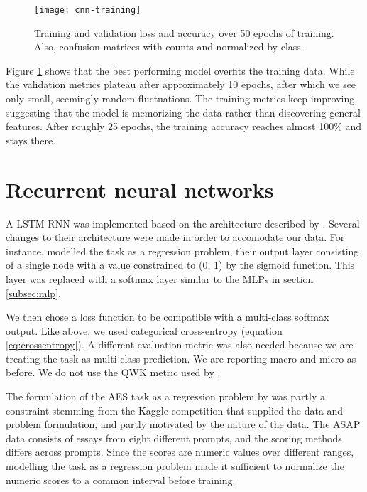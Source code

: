 \begin{figure}
  \centering
  \texttt{[image: cnn-training]}
  \caption{Training and validation loss and accuracy over 50 epochs of training.
           Also, confusion matrices with counts and normalized by class.}
  \label{fig:cnn-training}
\end{figure}

Figure \ref{fig:cnn-training} shows that the best performing model overfits
the training data. While the validation metrics plateau after approximately
10 epochs, after which we see only small, seemingly random fluctuations.
The training metrics keep improving, suggesting that the model is memorizing
the data rather than discovering general features. After roughly 25 epochs,
the training accuracy reaches almost 100\% and stays there.


\section{Recurrent neural networks}

A \ac{LSTM} \ac{RNN} was implemented based on the architecture described by
\textcite{taghipour16}. Several changes to their architecture were made in
order to accomodate our data. For instance, \citeauthor{taghipour16} modelled
the task as a regression problem, their output layer consisting of a single
node with a value constrained to (0, 1) by the sigmoid function. This layer
was replaced with a softmax layer similar to the \acp{MLP} in section
\ref{subsec:mlp}.

We then chose a loss function to be compatible with a multi-class softmax
output. Like above, we used categorical cross-entropy (equation
\ref{eq:crossentropy}). A different evaluation metric was also needed because
we are treating the task as multi-class prediction. We are reporting macro
and micro \FI as before. We do not use the \ac{QWK} metric used by
\citeauthor{taghipour16}. 

The formulation of the \ac{AES} task as a regression problem by
\citeauthor{taghipour16} was partly a constraint stemming from the Kaggle
competition that supplied the data and problem formulation, and partly
motivated by the nature of the data. The ASAP data consists of essays from
eight different prompts, and the scoring methods differs across prompts.
Since the scores are numeric values over different ranges, modelling the task
as a regression problem made it sufficient to normalize the numeric scores to
a common interval before training.

